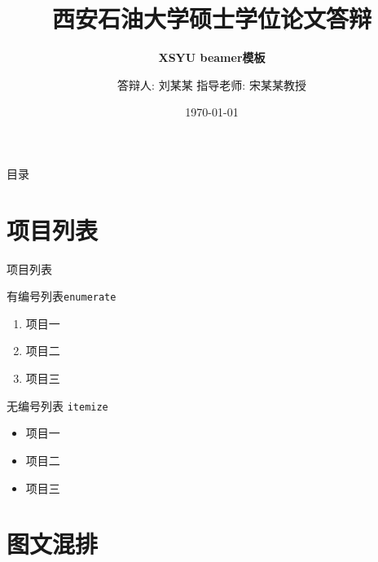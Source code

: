 \documentclass[10pt,aspectratio=43,mathserif,table]{beamer}
\title{西安石油大学硕士学位论文答辩}
\subtitle{\fontsize{9pt}{14pt}\textbf{XSYU beamer模板}}
\author{答辩人: 刘某某 \newline \newline 指导老师: 宋某某教授}
\institute{\fontsize{6pt}{10pt}计算机学院}
\date{\today}
\begin{document}

\frame{\titlepage}

\section[目录]{}   %
\begin{frame}{目录}
\tableofcontents
\end{frame}

\section{项目列表}
\begin{frame}[c]{项目列表}

{\large 有编号列表\texttt{enumerate}}
	\begin{enumerate}[<+->]
		\item 项目一
		\item 项目二
		\item 项目三
	\end{enumerate}
\vfill
{\large 无编号列表 \texttt{itemize}}	
	\begin{itemize}[<+->]
		\item 项目一
		\item 项目二
		\item 项目三
	\end{itemize}
\end{frame}	
\section{图文混排}  %
\end{document}
